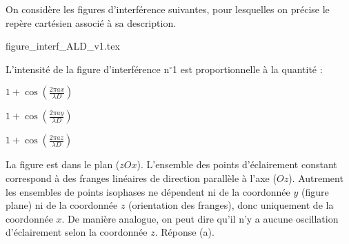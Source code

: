 \hauteurLargeurCadreReponse		{8mm}{1.5cm}
\initialisationEntrainement

On considère les figures d'interférence suivantes, pour lesquelles on précise le repère cartésien associé à sa description. 

\begin{center}
	{figure_interf_ALD_v1.tex}
\end{center}


\debutEntrainement


\begin{enonce}
	L'intensité de la figure d'interférence n$^\circ$1 est proportionnelle à la quantité : 
	
	\begin{listeQCM3Colonnes}
	\item $1+ \cos \left(\frac{2\pi a x}{\lambda D} \right)$
	\item $1+ \cos \left(\frac{2\pi a y}{\lambda D} \right)$
	\item $1+ \cos \left(\frac{2\pi a z}{\lambda D} \right)$
	\end{listeQCM3Colonnes}

\end{enonce}

\reponse{\reponseA{}}

\begin{corrige}
	La figure est dans le plan ($zOx$). L'ensemble des points d'éclairement constant correspond à des franges linéaires de direction parallèle à l'axe ($Oz$). Autrement les ensembles de points isophases ne dépendent ni de la coordonnée $y$ (figure plane) ni de la coordonnée $z$ (orientation des franges), donc uniquement de la coordonnée $x$. De manière analogue, on peut dire qu'il n'y a aucune oscillation d'éclairement selon la coordonnée $z$. Réponse (a).
\end{corrige}

